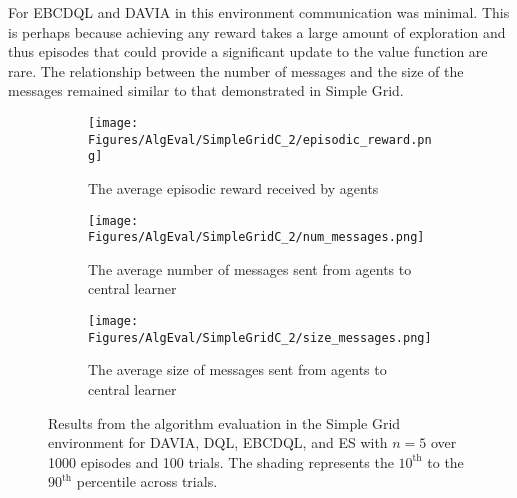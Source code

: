 For EBCDQL and DAVIA in this environment communication was minimal. This is perhaps because achieving any reward takes a large amount of exploration and thus episodes that could provide a significant update to the value function are rare. The relationship between the number of messages and the size of the messages remained similar to that demonstrated in Simple Grid.



\begin{figure}[H]
    \centering
    \begin{subfigure}{0.5\textwidth}
        \centering
        \texttt{[image: Figures/AlgEval/SimpleGridC\_2/episodic\_reward.png]}
        \caption{The average episodic reward received by agents}
        \label{fig:EvalSGReward}
    \end{subfigure}
    \begin{subfigure}{0.5\textwidth}
        \centering
        \texttt{[image: Figures/AlgEval/SimpleGridC\_2/num\_messages.png]}
        \caption{The average number of messages sent from agents to central learner}
        \label{fig:EvalSGNumMessages}
    \end{subfigure}
    \begin{subfigure}{0.5\textwidth}
        \centering
        \texttt{[image: Figures/AlgEval/SimpleGridC\_2/size\_messages.png]}
        \caption{The average size of messages sent from agents to central learner}
        \label{fig:EvalSGSizeMessages}
    \end{subfigure}
    \caption{Results from the algorithm evaluation in the Simple Grid environment for DAVIA, DQL, EBCDQL, and ES with $n=5$ over 1000 episodes and 100 trials. The shading represents the $10^\text{th}$ to the $90^{\text{th}}$ percentile across trials.}
    \label{fig:EvalSG}
\end{figure}


